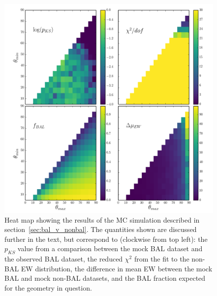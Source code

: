 
\begin{figure} %
\centering
\includegraphics[width=1.0\textwidth]{figures/ewpaper/mesh4_ew_o3_max_sdss.png}
\caption
{
Heat map showing the results of the MC simulation described in 
section~\ref{sec:bal_v_nonbal}. The quantities shown are discussed 
further in the text, but correspond to (clockwise from top left):
the $p_{KS}$ value from a comparison between the mock BAL dataset
and the observed BAL dataset, the reduced $\chi^2$ from the fit to
the non-BAL EW distribution, the difference in mean EW between the 
mock BAL and mock non-BAL datasets, and the BAL fraction expected
for the geometry in question.
}
\label{fig:contour}
\end{figure} %

